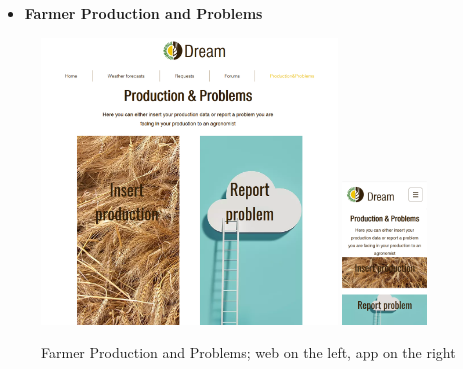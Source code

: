 \documentclass{article}
\begin{document}
    \newpage
    
    \begin{itemize}
        \item \textbf{Farmer Production and Problems}
    \end{itemize}
        \begin{figure} [h]
            \centering
            \includegraphics[width=0.7\textwidth]{images/UserInterfaces/Farmer/ProductionAndProblems/ProductionProblemsWeb.png}
            \quad
            \includegraphics[width=0.2\textwidth]{images/UserInterfaces/Farmer/ProductionAndProblems/ProductionProblemsApp.png}
            \quad
            \caption{\label{fig:farmerProduction}Farmer Production and Problems; web on the left, app on the right}
        \end{figure}
        \newpage
\end{document}
